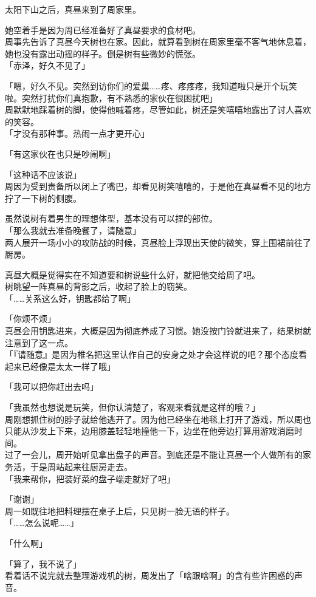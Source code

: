 \vspace{2\baselineskip}

太阳下山之后，真昼来到了周家里。

她空着手是因为周已经准备好了真昼要求的食材吧。\\

周事先告诉了真昼今天树也在家。因此，就算看到树在周家里毫不客气地休息着，她也没有露出动摇的样子。倒是树有些微妙的慌张。\\

「赤泽，好久不见了」

「嗯，好久不见。突然到访你们的爱巢……疼、疼疼疼，我知道啦只是开个玩笑啦。突然打扰你们真抱歉，有不熟悉的家伙在很困扰吧」\\

周默默地踩着树的脚，使得他喊着疼，尽管如此，树还是笑嘻嘻地露出了讨人喜欢的笑容。\\

「才没有那种事。热闹一点才更开心」

「有这家伙在也只是吵闹啊」

「这种话不应该说」\\

周因为受到责备所以闭上了嘴巴，却看见树笑嘻嘻的，于是他在真昼看不见的地方拧了一下树的侧腹。

虽然说树有着男生的理想体型，基本没有可以捏的部位。\\

「那么我就去准备晚餐了，请随意」\\

两人展开一场小小的攻防战的时候，真昼脸上浮现出天使的微笑，穿上围裙前往了厨房。

真昼大概是觉得实在不知道要和树说些什么好，就把他交给周了吧。\\

树眺望一阵真昼的背影之后，收起了脸上的窃笑。\\

「……关系这么好，钥匙都给了啊」

「你烦不烦」\\

真昼会用钥匙进来，大概是因为彻底养成了习惯。她没按门铃就进来了，结果树就注意到了这一点。\\

「『请随意』是因为椎名把这里认作自己的安身之处才会这样说的吧？那个态度看起来已经像是太太一样了哦」

「我可以把你赶出去吗」

「我虽然也想说是玩笑，但你认清楚了，客观来看就是这样的哦？」\\

周刚想抓住树的脖子就给他逃开了。因为他已经坐在地毯上打开了游戏，所以周也只能从沙发上下来，边用膝盖轻轻地撞他一下，边坐在他旁边打算用游戏消磨时间。\\

过了一会儿，周开始听见拿出盘子的声音。到底还是不能让真昼一个人做所有的家务活，于是周站起来往厨房走去。\\

「我来帮你，把装好菜的盘子端走就好了吧」

「谢谢」\\

周一如既往地把料理摆在桌子上后，只见树一脸无语的样子。\\

「……怎么说呢……」

「什么啊」

「算了，我不说了」\\

看着话不说完就去整理游戏机的树，周发出了「啥跟啥啊」的含有些许困惑的声音。
